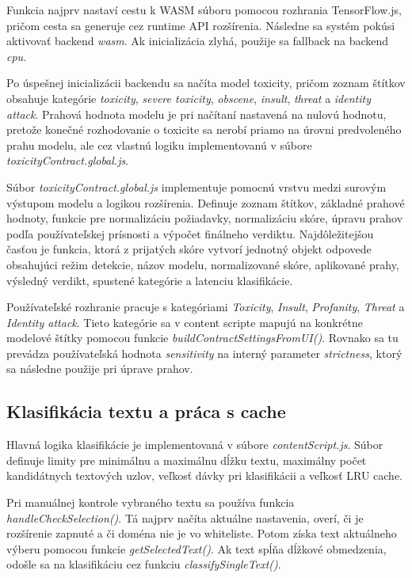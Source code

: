 Funkcia najprv nastaví cestu k WASM súboru pomocou rozhrania TensorFlow.js, pričom cesta sa generuje cez runtime API rozšírenia. Následne sa systém pokúsi aktivovať backend \emph{wasm}. Ak inicializácia zlyhá, použije sa fallback na backend \emph{cpu}.

Po úspešnej inicializácii backendu sa načíta model toxicity, pričom zoznam štítkov obsahuje kategórie \emph{toxicity}, \emph{severe toxicity}, \emph{obscene}, \emph{insult}, \emph{threat} a \emph{identity attack}. Prahová hodnota modelu je pri načítaní nastavená na nulovú hodnotu, pretože konečné rozhodovanie o toxicite sa nerobí priamo na úrovni predvoleného prahu modelu, ale cez vlastnú logiku implementovanú v súbore \emph{toxicityContract.global.js}.

Súbor \emph{toxicityContract.global.js} implementuje pomocnú vrstvu medzi surovým výstupom modelu a logikou rozšírenia. Definuje zoznam štítkov, základné prahové hodnoty, funkcie pre normalizáciu požiadavky, normalizáciu skóre, úpravu prahov podľa používateľskej prísnosti a výpočet finálneho verdiktu. Najdôležitejšou časťou je funkcia, ktorá z prijatých skóre vytvorí jednotný objekt odpovede obsahujúci režim detekcie, názov modelu, normalizované skóre, aplikované prahy, výsledný verdikt, spustené kategórie a latenciu klasifikácie.

Používateľské rozhranie pracuje s kategóriami \textit{Toxicity}, \textit{Insult}, \textit{Profanity}, \textit{Threat} a \textit{Identity attack}. Tieto kategórie sa v content scripte mapujú na konkrétne modelové štítky pomocou funkcie \emph{buildContractSettingsFromUI()}. Rovnako sa tu prevádza používateľská hodnota \emph{sensitivity} na interný parameter \emph{strictness}, ktorý sa následne použije pri úprave prahov.

\subsection{Klasifikácia textu a práca s cache}
Hlavná logika klasifikácie je implementovaná v súbore \emph{contentScript.js}. Súbor definuje limity pre minimálnu a maximálnu dĺžku textu, maximálny počet kandidátnych textových uzlov, veľkosť dávky pri klasifikácii a veľkosť LRU cache.

Pri manuálnej kontrole vybraného textu sa používa funkcia \emph{handleCheckSelection()}. Tá najprv načíta aktuálne nastavenia, overí, či je rozšírenie zapnuté a či doména nie je vo whiteliste. Potom získa text aktuálneho výberu pomocou funkcie \emph{getSelectedText()}. Ak text spĺňa dĺžkové obmedzenia, odošle sa na klasifikáciu cez funkciu \emph{classifySingleText()}.

